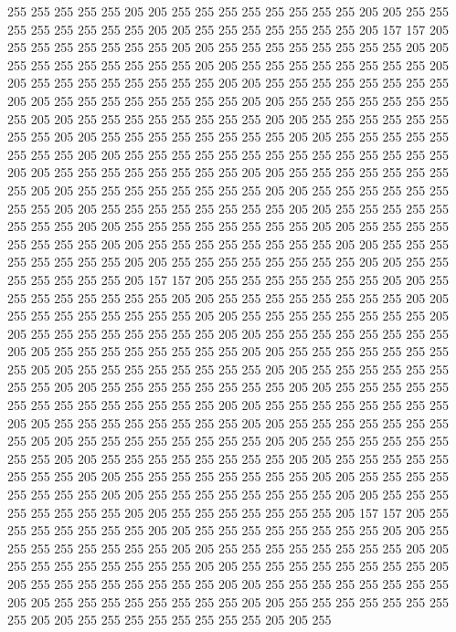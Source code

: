255 255 255 255 255 205 205 255 255 255 255 255 255 255 255 205 205 255 255 255
255 255 255 255 255 205 205 255 255 255 255 255 255 255 205 157 157 205 255 255
255 255 255 255 255 205 205 255 255 255 255 255 255 255 255 205 205 255 255 255
255 255 255 255 255 205 205 255 255 255 255 255 255 255 255 205 205 255 255 255
255 255 255 255 255 205 205 255 255 255 255 255 255 255 255 205 205 255 255 255
255 255 255 255 255 205 205 255 255 255 255 255 255 255 255 205 205 255 255 255
255 255 255 255 255 205 205 255 255 255 255 255 255 255 255 205 205 255 255 255
255 255 255 255 255 205 205 255 255 255 255 255 255 255 255 205 205 255 255 255
255 255 255 255 255 255 255 255 255 255 255 205 205 255 255 255 255 255 255 255
255 205 205 255 255 255 255 255 255 255 255 205 205 255 255 255 255 255 255 255
255 205 205 255 255 255 255 255 255 255 255 205 205 255 255 255 255 255 255 255
255 205 205 255 255 255 255 255 255 255 255 205 205 255 255 255 255 255 255 255
255 205 205 255 255 255 255 255 255 255 255 205 205 255 255 255 255 255 255 255
255 205 205 255 255 255 255 255 255 255 255 205 205 255 255 255 255 255 255 255
255 205 205 255 255 255 255 255 255 255 205 157 157 205 255 255 255 255 255 255
255 205 205 255 255 255 255 255 255 255 255 205 205 255 255 255 255 255 255 255
255 205 205 255 255 255 255 255 255 255 255 205 205 255 255 255 255 255 255 255
255 205 205 255 255 255 255 255 255 255 255 205 205 255 255 255 255 255 255 255
255 205 205 255 255 255 255 255 255 255 255 205 205 255 255 255 255 255 255 255
255 205 205 255 255 255 255 255 255 255 255 205 205 255 255 255 255 255 255 255
255 205 205 255 255 255 255 255 255 255 255 205 205 255 255 255 255 255 255 255
255 255 255 255 255 255 255 205 205 255 255 255 255 255 255 255 255 205 205 255
255 255 255 255 255 255 255 205 205 255 255 255 255 255 255 255 255 205 205 255
255 255 255 255 255 255 255 205 205 255 255 255 255 255 255 255 255 205 205 255
255 255 255 255 255 255 255 205 205 255 255 255 255 255 255 255 255 205 205 255
255 255 255 255 255 255 255 205 205 255 255 255 255 255 255 255 255 205 205 255
255 255 255 255 255 255 255 205 205 255 255 255 255 255 255 255 255 205 205 255
255 255 255 255 255 255 205 157 157 205 255 255 255 255 255 255 255 205 205 255
255 255 255 255 255 255 255 205 205 255 255 255 255 255 255 255 255 205 205 255
255 255 255 255 255 255 255 205 205 255 255 255 255 255 255 255 255 205 205 255
255 255 255 255 255 255 255 205 205 255 255 255 255 255 255 255 255 205 205 255
255 255 255 255 255 255 255 205 205 255 255 255 255 255 255 255 255 205 205 255
255 255 255 255 255 255 255 205 205 255 255 255 255 255 255 255 255 205 205 255
